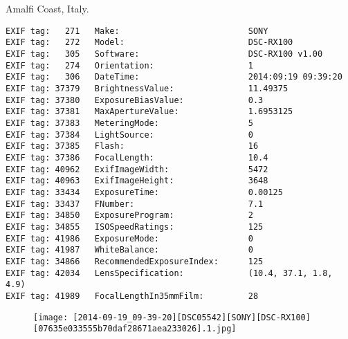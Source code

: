 \section{\protect{}}
\noindent Amalfi Coast, Italy.
\noindent
\begin{lstlisting}
EXIF tag:   271   Make:                          SONY
EXIF tag:   272   Model:                         DSC-RX100
EXIF tag:   305   Software:                      DSC-RX100 v1.00
EXIF tag:   274   Orientation:                   1
EXIF tag:   306   DateTime:                      2014:09:19 09:39:20
EXIF tag: 37379   BrightnessValue:               11.49375
EXIF tag: 37380   ExposureBiasValue:             0.3
EXIF tag: 37381   MaxApertureValue:              1.6953125
EXIF tag: 37383   MeteringMode:                  5
EXIF tag: 37384   LightSource:                   0
EXIF tag: 37385   Flash:                         16
EXIF tag: 37386   FocalLength:                   10.4
EXIF tag: 40962   ExifImageWidth:                5472
EXIF tag: 40963   ExifImageHeight:               3648
EXIF tag: 33434   ExposureTime:                  0.00125
EXIF tag: 33437   FNumber:                       7.1
EXIF tag: 34850   ExposureProgram:               2
EXIF tag: 34855   ISOSpeedRatings:               125
EXIF tag: 41986   ExposureMode:                  0
EXIF tag: 41987   WhiteBalance:                  0
EXIF tag: 34866   RecommendedExposureIndex:      125
EXIF tag: 42034   LensSpecification:             (10.4, 37.1, 1.8, 4.9)
EXIF tag: 41989   FocalLengthIn35mmFilm:         28

\end{lstlisting}
\clearpage
\begin{figure}
\raggedleft
\texttt{[image: [2014-09-19\_09-39-20][DSC05542][SONY][DSC-RX100][07635e033555b70daf28671aea233026].1.jpg]}
\end{figure}


\clearpage

